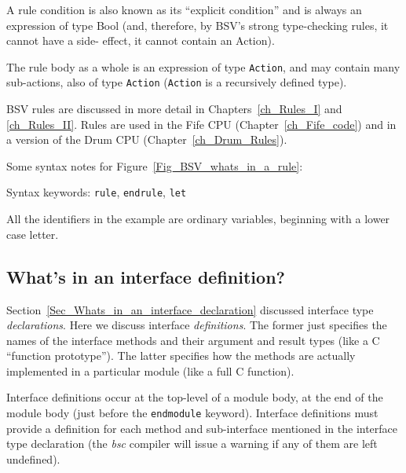 A rule condition is also known as its ``explicit condition'' and is
always an expression of type Bool (and, therefore, by BSV's strong
type-checking rules, it cannot have a side- effect, {\ie} it cannot
contain an Action).

The rule body as a whole is an expression of type \verb|Action|, and
may contain many sub-actions, also of type \verb|Action|
(\verb|Action| is a recursively defined type).

BSV rules are discussed in more detail in Chapters~\ref{ch_Rules_I}
and \ref{ch_Rules_II}.  Rules are used in the Fife CPU
(Chapter~\ref{ch_Fife_code}) and in a version of the Drum CPU
(Chapter~\ref{ch_Drum_Rules}).

Some syntax notes for Figure~\ref{Fig_BSV_whats_in_a_rule}:

\begin{tightlist}

 \item Syntax keywords: \verb|rule|, \verb|endrule|, \verb|let|

 \item All the identifiers in the example are ordinary variables,
       beginning with a lower case letter.

\end{tightlist}


\subsection{What's in an interface definition?}

\label{Sec_Whats_in_an_interface_definition}


Section~\ref{Sec_Whats_in_an_interface_declaration} discussed
interface type \emph{declarations}.  Here we discuss interface
\emph{definitions}.  The former just specifies the names of the
interface methods and their argument and result types (like a C
``function prototype'').  The latter specifies how the methods are
actually implemented in a particular module (like a full C function).

Interface definitions occur at the top-level of a module body, at the
end of the module body (just before the \verb|endmodule| keyword).
Interface definitions must provide a definition for each method and
sub-interface mentioned in the interface type declaration (the
\emph{bsc} compiler will issue a warning if any of them are left
undefined).

